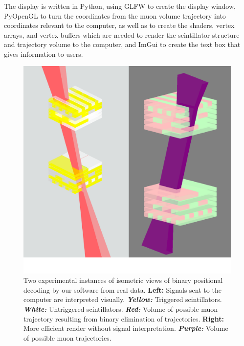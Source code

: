 The display is written in Python, using GLFW to create the display window, PyOpenGL to turn the coordinates from the muon volume trajectory into coordinates relevant to the computer, as well as to create the shaders, vertex arrays, and vertex buffers which are needed to render the scintillator structure and trajectory volume to the computer, and ImGui to create the text box that gives information to users.
\begin{figure}[h]
    \centering
    \includegraphics[scale=0.5]{figures/fig4.png}
    \caption{Two experimental instances of isometric views of binary positional decoding by our software from real data. \textbf{Left:} Signals sent to the computer are interpreted visually. \textbf{\textit{Yellow:}} Triggered scintillators. \textbf{\textit{White:}} Untriggered scintillators. \textbf{\textit{Red:}} Volume of possible muon trajectory resulting from binary elimination of trajectories. \textbf{Right:} More efficient render without signal interpretation. \textbf{\textit{Purple:}} Volume of possible muon trajectories.}
    \label{fig4}
\end{figure}